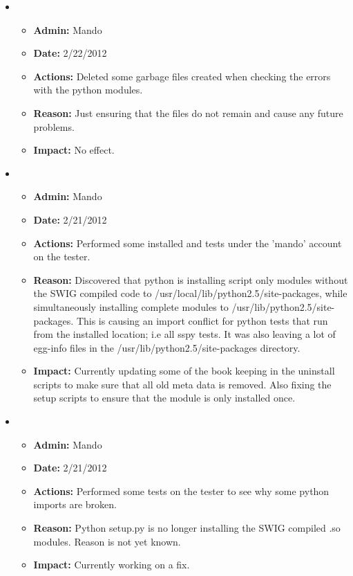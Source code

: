 \documentclass[12pt]{article}
\begin{document}
\begin{itemize}
\item
  \begin{itemize}
  \item[] {\bf Admin:} Mando
  \item[] {\bf Date:} 2/22/2012
  \item[] {\bf Actions:} Deleted some garbage files created when checking the errors with the python modules.
  \item[] {\bf Reason:} Just ensuring that the files do not remain and cause any future problems.
  \item[] {\bf Impact:} No effect.
  \end{itemize}

\item
  \begin{itemize}
  \item[] {\bf Admin:} Mando
  \item[] {\bf Date:} 2/21/2012
  \item[] {\bf Actions:} Performed some installed and tests under the 'mando' account on the tester.
  \item[] {\bf Reason:} Discovered that python is installing script only modules without the SWIG compiled code to /usr/local/lib/python2.5/site-packages, while simultaneously installing complete modules to /usr/lib/python2.5/site-packages. This is causing an import conflict for python tests that run from the installed location; i.e all sspy tests. It was also leaving a lot of egg-info files in the /usr/lib/python2.5/site-packages directory.
  \item[] {\bf Impact:} Currently updating some of the book keeping in the uninstall scripts to make sure that all old meta data is removed. Also fixing the setup scripts to ensure that the module is only installed once.
  \end{itemize}
  
\item
  \begin{itemize}
  \item[] {\bf Admin:} Mando
  \item[] {\bf Date:} 2/21/2012
  \item[] {\bf Actions:} Performed some tests on the tester to see why some python imports are broken.
  \item[] {\bf Reason:} Python setup.py is no longer installing the SWIG compiled .so modules. Reason is not yet known.
  \item[] {\bf Impact:} Currently working on a fix.
  \end{itemize}
  

\end{itemize}
\end{document}
